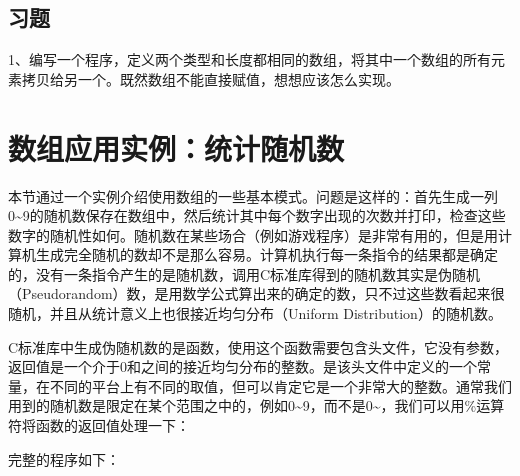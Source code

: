 \subsection*{习题}
%


1、编写一个程序，定义两个类型和长度都相同的数组，将其中一个数组的所有元素拷贝给另一个。既然数组不能直接赋值，想想应该怎么实现。




\section{数组应用实例：统计随机数}
%
本节通过一个实例介绍使用数组的一些基本模式。问题是这样的：首先生成一列0\textasciitilde{}\BookSplit{}9的随机数保存在数组中，然后统计其中每个数字出现的次数并打印，检查这些数字的随机性如何。随机数在某些场合（例如游戏程序）是非常有用的，但是用计算机生成完全随机的数却不是那么容易。计算机执行每一条指令的结果都是确定的，没有一条指令产生的是随机数，调用C标准库得到的随机数其实是伪随机（Pseudorandom）数，是用数学公式算出来的确定的数，只不过这些数看起来很随机，并且从统计意义上也很接近均匀分布（Uniform Distribution）的随机数。



C标准库中生成伪随机数的是函数，使用这个函数需要包含头文件，它没有参数，返回值是一个介于0和之间的接近均匀分布的整数。是该头文件中定义的一个常量，在不同的平台上有不同的取值，但可以肯定它是一个非常大的整数。通常我们用到的随机数是限定在某个范围之中的，例如0\textasciitilde{}\BookSplit{}9，而不是0\textasciitilde{}\BookSplit{}，我们可以用\%运算符将函数的返回值处理一下：




完整的程序如下：





